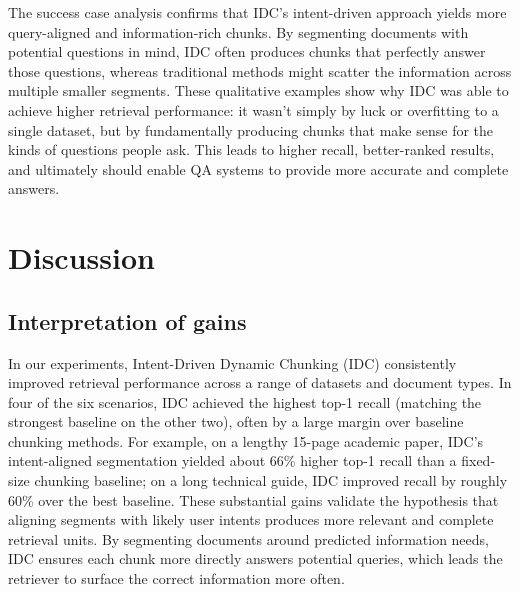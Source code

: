 \documentclass[12pt,a4paper]{report}
\begin{document}
The success case analysis confirms that IDC's intent-driven approach yields more query-aligned and information-rich chunks. By segmenting documents with potential questions in mind, IDC often produces chunks that perfectly answer those questions, whereas traditional methods might scatter the information across multiple smaller segments. These qualitative examples show why IDC was able to achieve higher retrieval performance: it wasn't simply by luck or overfitting to a single dataset, but by fundamentally producing chunks that make sense for the kinds of questions people ask. This leads to higher recall, better-ranked results, and ultimately should enable QA systems to provide more accurate and complete answers.

\chapter{Discussion}
\section{Interpretation of gains}

In our experiments, Intent-Driven Dynamic Chunking (IDC) consistently improved retrieval performance across a range of datasets and document types. In four of the six scenarios, IDC achieved the highest top-1 recall (matching the strongest baseline on the other two), often by a large margin over baseline chunking methods. For example, on a lengthy 15-page academic paper, IDC's intent-aligned segmentation yielded about 66\% higher top-1 recall than a fixed-size chunking baseline; on a long technical guide, IDC improved recall by roughly 60\% over the best baseline. These substantial gains validate the hypothesis that aligning segments with likely user intents produces more relevant and complete retrieval units. By segmenting documents around predicted information needs, IDC ensures each chunk more directly answers potential queries, which leads the retriever to surface the correct information more often.
\end{document}
